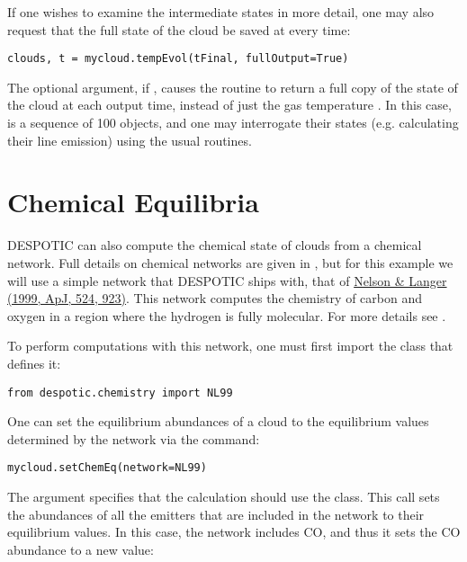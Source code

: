 \documentclass[letterpaper,10pt,english]{sphinxmanual}
\begin{document}
If one wishes to examine the intermediate states in more detail, one
may also request that the full state of the cloud be saved at every
time:

\begin{Verbatim}[commandchars=\\\{\}]
clouds, t = mycloud.tempEvol(tFinal, fullOutput=True)
\end{Verbatim}

The  optional argument, if , causes the routine
to return a full copy of the state of the cloud at each output time,
instead of just the gas temperature . In this case, 
is a sequence of 100  objects, and one may interrogate their
states (e.g. calculating their line emission) using the usual
routines.


\section{Chemical Equilibria}
\label{functions:chemical-equilibria}\label{functions:ssec-chem-eq}
DESPOTIC can also compute the chemical state of clouds from a chemical
network. Full details on chemical networks are given in
{\hyperref[chemistry:sec-chemistry]{\emph{}}}, but for this example we will use a simple network
that DESPOTIC ships with, that of \href{http://adsabs.harvard.edu/abs/1999ApJ...524..923N}{Nelson \& Langer (1999, ApJ,
524, 923)}. This
network computes the chemistry of carbon and oxygen in a region where
the hydrogen is fully molecular. For more details see
{\hyperref[chemistry:sssec-nl99]{\emph{}}}.

To perform computations with this network, one must first import the
class that defines it:

\begin{Verbatim}[commandchars=\\\{\}]
from despotic.chemistry import NL99
\end{Verbatim}

One can set the equilibrium abundances of a cloud to the equilibrium
values determined by the network via the command:

\begin{Verbatim}[commandchars=\\\{\}]
mycloud.setChemEq(network=NL99)
\end{Verbatim}

The argument  specifies that the calculation should use the
 class. This call sets the abundances of all the emitters that
are included in the network to their equilibrium values. In this case,
the network includes CO, and thus it sets the CO abundance to a new
value:
\end{document}
